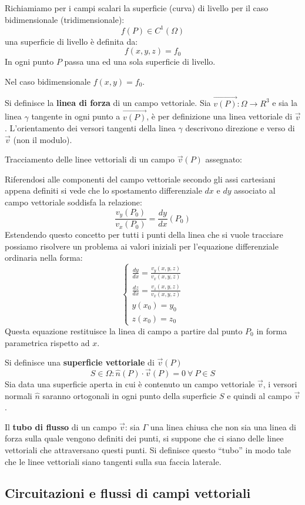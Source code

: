 Richiamiamo per i campi scalari la superficie (curva) di livello per il caso bidimensionale 
(tridimensionale):
$$
f(P) \in C^1(\Omega)
$$
una superficie di livello è definita da:
$$
f(x,y,z) = f_0
$$
In ogni punto $P$ passa una ed una sola superficie di livello.

Nel caso bidimensionale $f(x,y) = f_0$.


Si definisce la \textbf{linea di forza} di un campo vettoriale.
Sia $\vec{v(P)} : \Omega \to R^3$ e sia la linea $\gamma$ tangente in ogni punto a $\vec{v(P)}$,
è per definizione una linea vettoriale di $\vec{v}$.
L'orientamento dei versori tangenti della linea $\gamma$ descrivono direzione e verso di $\vec{v}$ 
(non il modulo).

Tracciamento delle linee vettoriali di un campo $\vec{v}(P)$ assegnato:

Riferendosi alle componenti del campo vettoriale secondo gli assi cartesiani appena definiti
si vede che lo spostamento differenziale $dx$ e $dy$ associato al campo vettoriale soddisfa la 
relazione:
$$
\frac{v_y(P_0)}{v_x(P_0)} = \frac{dy}{dx}(P_0)
$$
Estendendo questo concetto per tutti i punti della linea che si vuole tracciare
possiamo risolvere un problema ai valori iniziali per l'equazione differenziale ordinaria nella
forma:
$$
\begin{cases}
\frac{dy}{dx} = \frac{v_y(x,y,z)}{v_x(x,y,z)} \\
\frac{dz}{dx} = \frac{v_z(x,y,z)}{v_x(x,y,z)}\\
y(x_0) = y_0 \\
z(x_0) = z_0
\end{cases}
$$
Questa equazione restituisce la linea di campo a partire dal punto $P_0$ in forma parametrica
rispetto ad $x$.

Si definisce una \textbf{superficie vettoriale} di $\vec{v}(P)$
$$
S\in \Omega: \hat{n}(P)\cdot\vec{v}(P) = 0\ \forall\ P \in S
$$
Sia data una superficie aperta in cui è contenuto un campo vettoriale $\vec{v}$,
i versori normali $\hat{n}$ saranno ortogonali in ogni punto della superficie $S$ e quindi al 
campo $\vec{v}$.

Il \textbf{tubo di flusso} di un campo $\vec{v}$: 
sia $\Gamma$ una linea chiusa che non sia una linea di forza
sulla quale vengono definiti dei punti, si suppone che ci siano delle linee vettoriali che attraversano
questi punti. Si definisce questo ``tubo'' in modo tale che le linee vettoriali siano tangenti sulla sua faccia laterale.
\newpage
\subsection{Circuitazioni e flussi di campi vettoriali}


